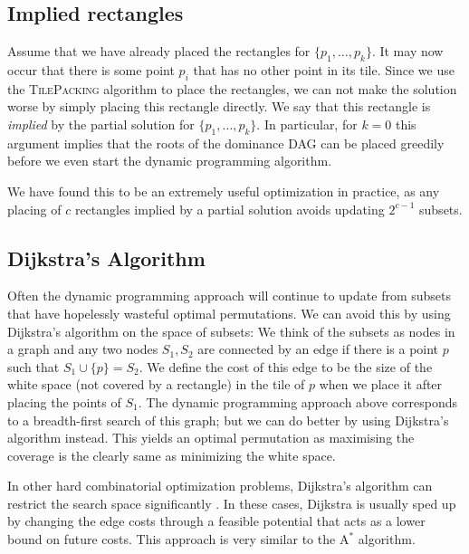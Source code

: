 \documentclass[11pt, a4paper, twocolumn]{article}
\begin{document}

\subsection{Implied rectangles}

Assume that we have already placed the rectangles for $\{p_1, \dots, p_k\}$. It may now occur that
there is some point $p_i$ that has no other point in its tile. Since we use the \textsc{TilePacking}
algorithm to place the rectangles, we can not make the solution worse by simply placing this rectangle
directly. We say that this rectangle is \textit{implied} by the partial solution for $\{p_1, \dots, p_k\}$.
In particular, for $k = 0$ this argument implies that the roots of the dominance DAG can be
placed greedily before we even start the dynamic programming algorithm.

We have found this to be an extremely useful optimization in practice, as any placing of $c$ rectangles
implied by a partial solution avoids updating $2^{c-1}$ subsets.

\subsection{Dijkstra's Algorithm}

Often the dynamic programming approach will continue to update from subsets that have hopelessly
wasteful optimal permutations. We can avoid this by using Dijkstra's algorithm on the space of
subsets: We think of the subsets as nodes in a graph and any two nodes $S_1, S_2$ are connected
by an edge if there is a point $p$ such that $S_1 \cup \{p\} = S_2$. We define the cost of
this edge to be the size of the white space (not covered by a rectangle) in the tile of $p$ when we
place it after placing the points of $S_1$. The dynamic programming approach above corresponds to
a breadth-first search of this graph; but we can do better by using Dijkstra's algorithm instead.
This yields an optimal permutation as maximising the coverage is the clearly same as minimizing the white space.

In other hard combinatorial optimization problems, Dijkstra's algorithm can restrict the search space
significantly \cite{hougardy2015dijkstra}. In these cases, Dijkstra is usually sped up by 
changing the edge costs through a feasible potential that acts as a lower bound on future costs.
This approach is very similar to the $\text{A}^*$ algorithm.
\end{document}

